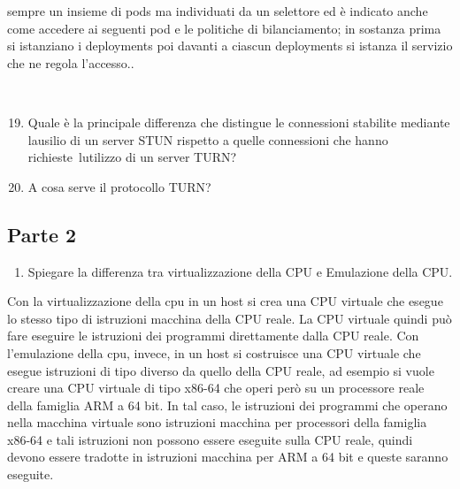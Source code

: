 \documentclass[
]{article}
\providecommand{\tightlist}{%
  \setlength{\itemsep}{0pt}\setlength{\parskip}{0pt}}
\begin{document}
{sempre un insieme di pods ma individuati da un selettore ed è indicato
anche come accedere ai seguenti pod e le politiche di bilanciamento; in
sostanza prima si istanziano i deployments poi davanti a ciascun
deployments si istanza il servizio che ne regola l'accesso..}

{~~~~~~~~}

{}

\begin{enumerate}
\setcounter{enumi}{18}
\tightlist
\item
  {Quale è la principale differenza che distingue le connessioni
  stabilite mediante l\textquotesingle ausilio di un server STUN
  rispetto a quelle connessioni che hanno
  }{richieste}{~l\textquotesingle utilizzo di un server TURN? }
\end{enumerate}

{}

{}

{}

{}

\begin{enumerate}
\setcounter{enumi}{19}
\tightlist
\item
  {A cosa serve il protocollo TURN?}
\end{enumerate}

{}

{}

{}

\subsection{\texorpdfstring{{Parte 2}}{Parte 2}}\label{h.lx0jsvh85x20}

\begin{enumerate}
\tightlist
\item
  {Spiegare la differenza tra virtualizzazione della CPU e Emulazione
  della CPU.}
\end{enumerate}

{}

{Con la virtualizzazione della cpu in un host si crea una CPU virtuale
che esegue lo stesso tipo di istruzioni macchina della CPU reale. La CPU
virtuale quindi può fare eseguire le istruzioni dei programmi
direttamente dalla CPU reale. Con l'emulazione della cpu, invece, in un
host si costruisce una CPU virtuale che esegue istruzioni di tipo
diverso da quello della CPU reale, ad esempio si vuole creare una CPU
virtuale di tipo x86-64 che operi però su un processore reale della
famiglia ARM a 64 bit. In tal caso, le istruzioni dei programmi che
operano nella macchina virtuale sono istruzioni macchina per processori
della famiglia x86-64 e tali istruzioni non possono essere eseguite
sulla CPU reale, quindi devono essere tradotte in istruzioni macchina
per ARM a 64 bit e queste saranno eseguite. }
\end{document}
